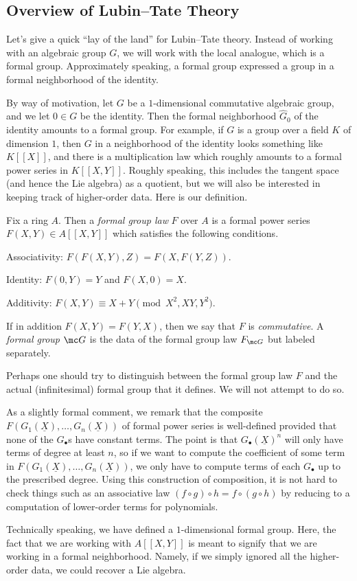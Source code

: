 \documentclass[../notes.tex]{subfiles}
\begin{document}
\subsection{Overview of Lubin--Tate Theory}
Let's give a quick ``lay of the land'' for Lubin--Tate theory. Instead of working with an algebraic group $G$, we will work with the local analogue, which is a formal group. Approximately speaking, a formal group expressed a group in a formal neighborhood of the identity.

By way of motivation, let $G$ be a $1$-dimensional commutative algebraic group, and we let $0\in G$ be the identity. Then the formal neighborhood $\widehat G_0$ of the identity amounts to a formal group. For example, if $G$ is a group over a field $K$ of dimension $1$, then $G$ in a neighborhood of the identity looks something like $K[[X]]$, and there is a multiplication law which roughly amounts to a formal power series in $K[[X,Y]]$. Roughly speaking, this includes the tangent space (and hence the Lie algebra) as a quotient, but we will also be interested in keeping track of higher-order data. Here is our definition.
\begin{definition}
	Fix a ring $A$. Then a \textit{formal group law} $F$ over $A$ is a formal power series $F(X,Y)\in A[[X,Y]]$ which satisfies the following conditions.
	\begin{listalph}
		\item Associativity: $F(F(X,Y),Z)=F(X,F(Y,Z))$.
		\item Identity: $F(0,Y)=Y$ and $F(X,0)=X$.
		\item Additivity: $F(X,Y)\equiv X+Y\pmod{X^2,XY,Y^2}$.
	\end{listalph}
	If in addition $F(X,Y)=F(Y,X)$, then we say that $F$ is \textit{commutative}. A \textit{formal group} $\mc G$ is the data of the formal group law $F_{\mc G}$ but labeled separately.
\end{definition}
\begin{remark}
	Perhaps one should try to distinguish between the formal group law $F$ and the actual (infinitesimal) formal group that it defines. We will not attempt to do so.
\end{remark}
\begin{remark}
	As a slightly formal comment, we remark that the composite $F(G_1(\underline X),\ldots,G_n(\underline X))$ of formal power series is well-defined provided that none of the $G_\bullet$s have constant terms. The point is that $G_\bullet(\underline X)^n$ will only have terms of degree at least $n$, so if we want to compute the coefficient of some term in $F(G_1(\underline X),\ldots,G_n(\underline X))$, we only have to compute terms of each $G_\bullet$ up to the prescribed degree. Using this construction of composition, it is not hard to check things such as an associative law $(f\circ g)\circ h=f\circ(g\circ h)$ by reducing to a computation of lower-order terms for polynomials.
\end{remark}
Technically speaking, we have defined a $1$-dimensional formal group. Here, the fact that we are working with $A[[X,Y]]$ is meant to signify that we are working in a formal neighborhood. Namely, if we simply ignored all the higher-order data, we could recover a Lie algebra.
\end{document}
